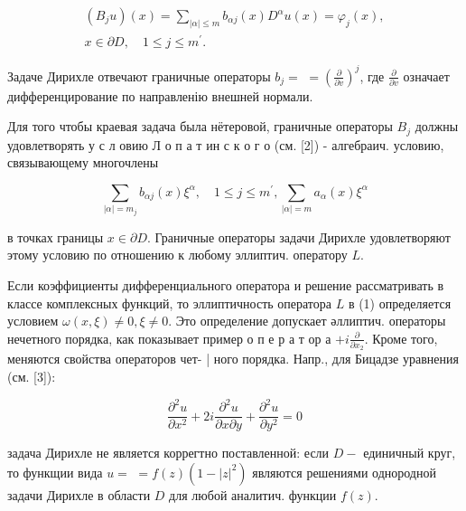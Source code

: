 \documentclass[10pt]{article}
\begin{document}
\[

\begin{gathered}

\left(B_{j} u\right)(x)=\sum_{|\alpha| \leqslant m} b_{\alpha j}(x) D^{\alpha} u(x)=\varphi_{j}(x), \\

x \in \partial D, \quad 1 \leqslant j \leqslant m^{\prime} .

\end{gathered}

\]



Задаче Дирихле отвечают граничные операторы $b_{j}=$ $=\left(\frac{\partial}{\partial v}\right)^{j}$, где $\frac{\partial}{\partial v}$ означает дифференцирование по направленію внешней нормали.



Для того чтобы краевая задача была нётеровой, граничные операторы $B_{j}$ должны удовлетворять у с л овию Л о п а т ин с к о г о (см. [2]) - алгебраич. условию, связывающему многочлены



\[

\sum_{|\alpha|=m_{j}} b_{\alpha j}(x) \xi^{\alpha}, \quad 1 \leqslant j \leqslant m^{\prime}, \sum_{|\alpha|=m} a_{\alpha}(x) \xi^{\alpha}

\]



в точках границы $x \in \partial D$. Граничные операторы задачи Дирихле удовлетворяют этому условию по отношению к любому эллиптич. оператору $L$.



Если коэффициенты дифференциального оператора и решение рассматривать в классе комплексных функций, то эллиптичность оператора $L$ в (1) определяется условием $\omega(x, \xi) \neq 0, \xi \neq 0$. Это определение допускает әллиптич. операторы нечетного порядка, как показывает пример о п е р а т ор а $+i \frac{\partial}{\partial x_{2}}$. Кроме того, меняются свойства операторов чет- | ного порядка. Напр., для Бицадзе уравнения (см. [3]):



\[

\frac{\partial^{2} u}{\partial x^{2}}+2 i \frac{\partial^{2} u}{\partial x \partial y}+\frac{\partial^{2} u}{\partial y^{2}}=0

\]



задача Дирихле не является коррегтно поставленной: если $D-$ единичный круг, то функщии вида $u=$ $=f(z)\left(1-|z|^{2}\right)$ являются решениями однородной задачи Дирихле в области $D$ для любой аналитич. функции $f(z)$.
\end{document}
